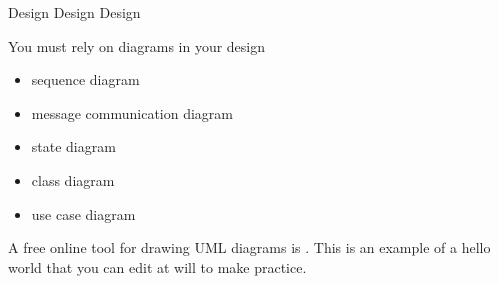 \documentclass[presentation]{beamer}\mode<presentation>{\usetheme{AMSBolognaFC}}
\begin{document}
\begin{frame}[c,allowframebreaks]{Design Design Design}
    \framebreak
    
    \vfill
    \begin{block}{You must rely on diagrams in your design}
        \begin{itemize}
            \item sequence diagram
            \item message communication diagram
            \item state diagram
            \item class diagram
            \item use case diagram
        \end{itemize}
    \end{block}
    A free online tool for drawing UML diagrams is .
    This is an example of a hello world  that you can edit at will to make practice.

\end{frame}
    
\end{document}
